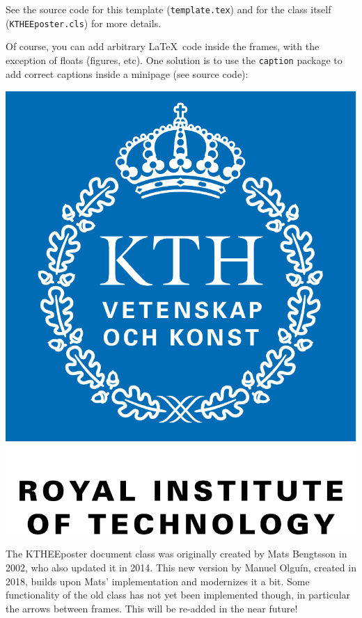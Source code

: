\documentclass[portrait, a0]{KTHEEposter}
\begin{document}
\begin{pcolumns}[3]
\begin{pcolumn}[3]
\begin{pframe}[.7]
            \end{pframe}
            \begin{pframe}[.2]
                See the source code for this template (\texttt{template.tex}) and for the class itself (\texttt{KTHEEposter.cls}) for more details.
            \end{pframe}
            \begin{pframe}[2.1]
                Of course, you can add arbitrary \LaTeX~code inside the frames, with the exception of floats (figures, etc).
                One solution is to use the \texttt{caption} package to add correct captions inside a minipage (see source code):
                
                \vskip 20mm
                
                \begin{minipage}{\linewidth}
                    \centering
                    \includegraphics[width=.7\linewidth]{Logo/kth_eng_cmyk}
                \end{minipage}
            \end{pframe}
        \end{pcolumn}%
        \begin{pcolumn}[3]
            \begin{pframe**}[1]
            \end{pframe**}
            \begin{pframe}[.5]
                The KTHEEposter document class was originally created by Mats Bengtsson in 2002, who also updated it in 2014.
                This new version by Manuel Olguín, created in 2018, builds upon Mats' implementation and modernizes it a bit.
                Some functionality of the old class has not yet been implemented though, in particular the arrows between frames.
                This will be re-added in the near future!
            \end{pframe}
            \begin{pframe}[1.5]

\end{pframe}
\end{pcolumn}
\end{pcolumns}
\end{document}
